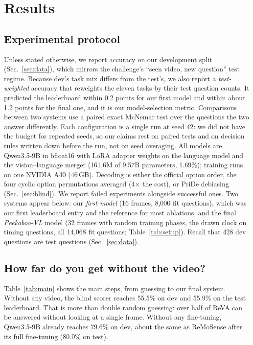 \section{Results}
\label{sec:results}

\subsection{Experimental protocol}
Unless stated otherwise, we report accuracy on our development split
(Sec.~\ref{sec:data}), which mirrors the challenge's ``seen video, new
question'' test regime. Because dev's task mix differs from the test's, we
also report a \emph{test-weighted} accuracy that reweights the eleven tasks
by their test question counts. It predicted the leaderboard within 0.2
points for our first model and within about 1.2 points for the final one,
and it is our model-selection metric. Comparisons between two systems
use a paired exact McNemar test over the questions the two answer
differently. Each configuration is a single run at seed 42: we did not have
the budget for repeated seeds, so our claims rest on paired tests and on
decision rules written down before the run, not on seed averaging. All
models are Qwen3.5-9B in bfloat16 with LoRA adapter weights on the language
model and the vision--language merger (161.6M of 9.57B parameters, 1.69\%);
training runs on one NVIDIA A40 (46\,GB). Decoding is either the official
option order, the four cyclic option permutations averaged (4$\times$ the
cost), or PriDe debiasing~\cite{zheng2024pride} (Sec.~\ref{sec:blind}). We
report failed experiments alongside successful ones. Two systems appear
below: our \emph{first model} (16 frames, 8,000 fit questions), which was
our first leaderboard entry and the reference for most ablations, and the
final \emph{Peekaboo-VL} model (32 frames with random training phases, the
drawn clock on timing questions, all 14,068 fit questions;
Table~\ref{tab:setup}). Recall that 428 dev questions are test questions
(Sec.~\ref{sec:data}).

\subsection{How far do you get without the video?}
Table~\ref{tab:main} shows the main steps, from guessing to our final
system. Without any video, the blind scorer reaches 55.5\% on dev and
55.9\% on the test leaderboard. That is more than double random guessing:
over half of ReVA can be answered without looking at a single frame.
Without any fine-tuning, Qwen3.5-9B already reaches 79.6\% on dev, about the
same as ReMoSense after its full fine-tuning (80.0\% on test).

